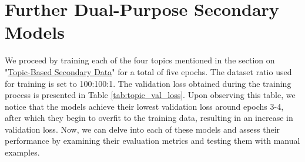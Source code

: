 \section{Further Dual-Purpose Secondary Models}

\begin{table}[ht]
    \centering
    \vspace{5pt}
    \caption{Validation loss collected during training across 5 epochs for each topic}
    \label{tab:topic_val_loss}
\end{table}

We proceed by training each of the four topics mentioned in the section on "\hyperref[topic_based_sec_data]{Topic-Based Secondary Data}" for a total of five epochs. The dataset ratio used for training is set to 100:100:1. The validation loss obtained during the training process is presented in Table \ref{tab:topic_val_loss}. Upon observing this table, we notice that the models achieve their lowest validation loss around epochs 3-4, after which they begin to overfit to the training data, resulting in an increase in validation loss. Now, we can delve into each of these models and assess their performance by examining their evaluation metrics and testing them with manual examples.

